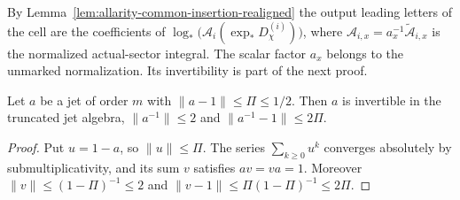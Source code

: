 By Lemma~\ref{lem:allarity-common-insertion-realigned} the output leading
letters of the cell are the coefficients of
$\log_*\bigl(\mathcal A_i(\exp_*D^{(i)}_\chi)\bigr)$, where
$\mathcal A_{i,x}=a_x^{-1}\widetilde{\mathcal A}_{i,x}$ is the normalized
actual-sector integral. The scalar factor $a_x$ belongs to the unmarked
normalization. Its invertibility is part of the next proof.

\begin{lemma}
\label{lem:allarity-jet-inverse}
Let $a$ be a jet of order $m$ with $\|a-1\|\le\Pi\le1/2$. Then $a$ is
invertible in the truncated jet algebra, $\|a^{-1}\|\le2$ and
$\|a^{-1}-1\|\le2\Pi$.
\end{lemma}
\begin{proof}
Put $u=1-a$, so $\|u\|\le\Pi$. The series $\sum_{k\ge0}u^k$ converges
absolutely by submultiplicativity, and its sum $v$ satisfies $av=va=1$.
Moreover $\|v\|\le(1-\Pi)^{-1}\le2$ and
$\|v-1\|\le\Pi(1-\Pi)^{-1}\le2\Pi$.
\end{proof}

